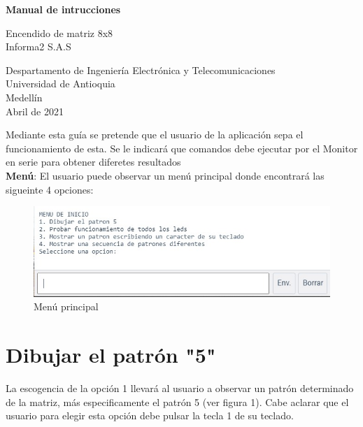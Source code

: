 \documentclass{article}
\begin{document}
\begin{titlepage}
    \begin{center}
        \vspace*{4cm}
            
        \Huge
        \textbf{Manual de intrucciones}
            
        \vspace{0.5cm}
        \LARGE
        Encendido de matriz 8x8\\ Informa2 S.A.S
            
        \vspace{1.5cm}
            
  
            
        \vfill
            
        \vspace{0.8cm}
            
        \Large
        Despartamento de Ingeniería Electrónica y Telecomunicaciones\\
        Universidad de Antioquia\\
        Medellín\\
        Abril de 2021
            
    \end{center}
\end{titlepage}

\tableofcontents
\newpage

 Mediante esta guía se pretende que el usuario de la aplicación sepa el funcionamiento de esta. Se le indicará que comandos debe ejecutar por el Monitor en serie para obtener diferetes resultados\\

\textbf{Menú}: El usuario puede observar un menú principal 
donde encontrará las sigueinte 4 opciones:

    \begin{figure}[h]
    \includegraphics[width=13cm]{menu.jpeg}
    \centering
    \caption{Menú principal}
    \label{menu}
    \end{figure}

\section{Dibujar el patrón "5"}\label{op1}
La escogencia de la opción 1 llevará al usuario a observar un patrón determinado de la matriz, más especificamente el patrón 5 (ver figura 1). Cabe aclarar que el usuario para elegir esta opción debe pulsar la tecla 1 de su teclado.
\end{document}
